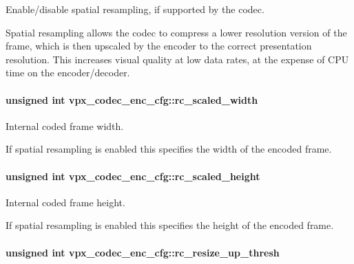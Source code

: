 Enable/disable spatial resampling, if supported by the codec. 

Spatial resampling allows the codec to compress a lower resolution version of the frame, which is then upscaled by the encoder to the correct presentation resolution. This increases visual quality at low data rates, at the expense of C\+PU time on the encoder/decoder. 
\paragraph[{\texorpdfstring{rc\+\_\+scaled\+\_\+width}{rc_scaled_width}}]{\setlength{\rightskip}{0pt plus 5cm}unsigned int vpx\+\_\+codec\+\_\+enc\+\_\+cfg\+::rc\+\_\+scaled\+\_\+width}\hypertarget{structvpx__codec__enc__cfg_a2edc2097b6c74f837f129d3cc8901fca}{}\label{structvpx__codec__enc__cfg_a2edc2097b6c74f837f129d3cc8901fca}


Internal coded frame width. 

If spatial resampling is enabled this specifies the width of the encoded frame. 
\paragraph[{\texorpdfstring{rc\+\_\+scaled\+\_\+height}{rc_scaled_height}}]{\setlength{\rightskip}{0pt plus 5cm}unsigned int vpx\+\_\+codec\+\_\+enc\+\_\+cfg\+::rc\+\_\+scaled\+\_\+height}\hypertarget{structvpx__codec__enc__cfg_a5586418c28a5f7f327c4ba7567467243}{}\label{structvpx__codec__enc__cfg_a5586418c28a5f7f327c4ba7567467243}


Internal coded frame height. 

If spatial resampling is enabled this specifies the height of the encoded frame. 
\paragraph[{\texorpdfstring{rc\+\_\+resize\+\_\+up\+\_\+thresh}{rc_resize_up_thresh}}]{\setlength{\rightskip}{0pt plus 5cm}unsigned int vpx\+\_\+codec\+\_\+enc\+\_\+cfg\+::rc\+\_\+resize\+\_\+up\+\_\+thresh}\hypertarget{structvpx__codec__enc__cfg_a855599c0660f31dfcab4a64996b4f6ad}{}\label{structvpx__codec__enc__cfg_a855599c0660f31dfcab4a64996b4f6ad}


